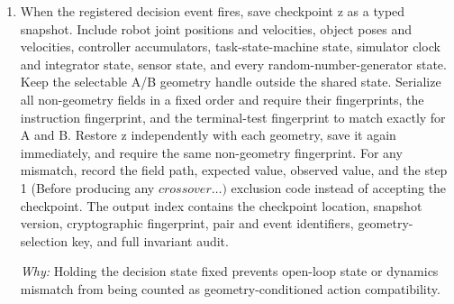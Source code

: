 \documentclass[10pt,a4paper]{article}
\begin{document}
\begin{enumerate}[leftmargin=*,start=1]
\par\emph{Why:} The functional pairs create the source intervention, while the appearance-only pairs test whether a result is merely caused by rendering sensitivity.
  \item When the registered decision event fires, save checkpoint z as a typed snapshot. Include robot joint positions and velocities, object poses and velocities, controller accumulators, task-state-machine state, simulator clock and integrator state, sensor state, and every random-number-generator state. Keep the selectable A/B geometry handle outside the shared state. Serialize all non-geometry fields in a fixed order and require their fingerprints, the instruction fingerprint, and the terminal-test fingerprint to match exactly for A and B. Restore z independently with each geometry, save it again immediately, and require the same non-geometry fingerprint. For any mismatch, record the field path, expected value, observed value, and the step 1 (Before producing any \(crossover\dots )\) exclusion code instead of accepting the checkpoint. The output index contains the checkpoint location, snapshot version, cryptographic fingerprint, pair and event identifiers, geometry-selection key, and full invariant audit.
\par\emph{Why:} Holding the decision state fixed prevents open-loop state or dynamics mismatch from being counted as geometry-conditioned action compatibility.
\end{enumerate}
\end{document}
